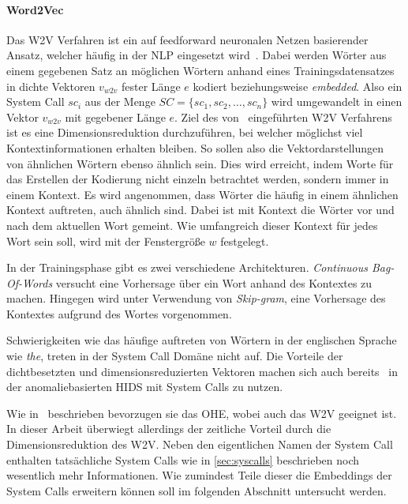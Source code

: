             \paragraph{Word2Vec}
                Das \ac{W2V} Verfahren ist ein auf feedforward neuronalen Netzen basierender Ansatz, welcher häufig in der \ac{NLP} eingesetzt wird~\cite{W2VAYYADEVARA2018}.
                Dabei werden Wörter aus einem gegebenen Satz an möglichen Wörtern anhand eines Trainingsdatensatzes in dichte Vektoren $v_{w2v}$ fester Länge $e$ kodiert beziehungsweise \textit{embedded}.
                Also ein System Call $sc_i$ aus der Menge $SC = \{sc_1,sc_2,\dots,sc_n\}$ wird umgewandelt in einen Vektor $v_{w2v}$ mit gegebener Länge $e$.
                Ziel des von~\cite{W2VMIKOLOV2013} eingeführten \ac{W2V} Verfahrens ist es eine Dimensionsreduktion durchzuführen, bei welcher möglichst viel Kontextinformationen erhalten bleiben.
                So sollen also die Vektordarstellungen von ähnlichen Wörtern ebenso ähnlich sein.
                Dies wird erreicht, indem Worte für das Erstellen der Kodierung nicht einzeln betrachtet werden, sondern immer in einem Kontext.
                Es wird angenommen, dass Wörter die häufig in einem ähnlichen Kontext auftreten, auch ähnlich sind.
                Dabei ist mit Kontext die Wörter vor und nach dem aktuellen Wort gemeint.
                Wie umfangreich dieser Kontext für jedes Wort sein soll, wird mit der Fenstergröße $w$ festgelegt.

                In der Trainingsphase gibt es zwei verschiedene Architekturen.
                \textit{Continuous Bag-Of-Words} versucht eine Vorhersage über ein Wort anhand des Kontextes zu machen.
                Hingegen wird unter Verwendung von \textit{Skip-gram}, eine Vorhersage des Kontextes aufgrund des Wortes vorgenommen.~\cite{EMBEDDINGPILEHVAR2020}

                Schwierigkeiten wie das häufige auftreten von Wörtern in der englischen Sprache wie \textit{the}, treten in der System Call Domäne nicht auf.
                Die Vorteile der dichtbesetzten und dimensionsreduzierten Vektoren machen sich auch bereits~\cite{IDSTHREADGRIMMER2021} in der anomaliebasierten \ac{HIDS} mit System Calls zu nutzen.

                Wie in~\cite{W2VWUNDERLICH2019} beschrieben bevorzugen sie das \ac{OHE}, wobei auch das \ac{W2V} geeignet ist.
                In dieser Arbeit überwiegt allerdings der zeitliche Vorteil durch die Dimensionsreduktion des \ac{W2V}.
                Neben den eigentlichen Namen der System Call enthalten tatsächliche System Calls wie in \autoref{sec:syscalls} beschrieben noch wesentlich mehr Informationen.
                Wie zumindest Teile dieser die Embeddings der System Calls erweitern können soll im folgenden Abschnitt untersucht werden.

